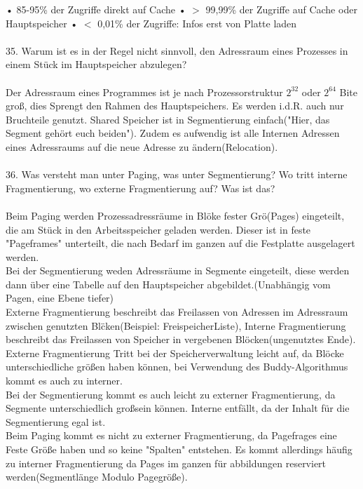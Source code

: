 \documentclass{article}
\begin{document}
• 85-95\% der Zugriffe direkt auf Cache
• $>$ 99,99\% der Zugriffe auf Cache oder Hauptspeicher
• $<$ 0,01\% der Zugriffe: Infos erst von Platte laden
\\
\\
35. Warum ist es in der Regel nicht sinnvoll, den Adressraum eines Prozesses in einem Stück
im Hauptspeicher abzulegen?
\\
\\
Der Adressraum eines Programmes ist je nach Prozessorstruktur $2^32$ oder $2^64$ Bite gro\ss, dies Sprengt den Rahmen des Hauptspeichers. Es werden i.d.R. auch nur Bruchteile genutzt. Shared Speicher ist in Segmentierung einfach("Hier, das Segment geh\"ort euch beiden"). Zudem es aufwendig ist alle Internen Adressen eines Adressraums auf die neue Adresse zu \"andern(Relocation).
\\
\\
36. Was versteht man unter Paging, was unter Segmentierung? Wo tritt interne Fragmentierung,
wo externe Fragmentierung auf? Was ist das?
\\
\\
Beim Paging werden Prozessadressr\"aume in Bl\"oke fester Gr\"o\sse(Pages) eingeteilt, die am St\"uck in den Arbeitsspeicher geladen werden. Dieser ist in feste "Pageframes" unterteilt, die nach Bedarf im ganzen auf die Festplatte ausgelagert werden.\\
Bei der Segmentierung weden Adressr\"aume in Segmente eingeteilt, diese werden dann \"uber eine Tabelle auf den Hauptspeicher abgebildet.(Unabh\"angig vom Pagen, eine Ebene tiefer)\\
Externe Fragmentierung beschreibt das Freilassen von Adressen im Adressraum zwischen genutzten Bl\"cken(Beispiel: FreispeicherListe), Interne Fragmentierung beschreibt das Freilassen von Speicher in vergebenen Bl\"ocken(ungenutztes Ende).
Externe Fragmentierung Tritt bei der Speicherverwaltung leicht auf, da Bl\"ocke unterschiedliche gr\"o\ss en haben k\"onnen, bei Verwendung des Buddy-Algorithmus kommt es auch zu interner.\\
Bei der Segmentierung kommt es auch leicht zu externer Fragmentierung, da Segmente unterschiedlich gro\ss sein k\"onnen. Interne entf\"allt, da der Inhalt f\"ur die Segmentierung egal ist.\\
Beim Paging kommt es nicht zu externer Fragmentierung, da Pagefrages eine Feste Gr\"o\ss e haben und so keine "Spalten" entstehen. Es kommt allerdings h\"aufig zu interner Fragmentierung da Pages im ganzen f\"ur abbildungen reserviert werden(Segmentl\"ange Modulo Pagegr\"o\ss e).
\end{document}
